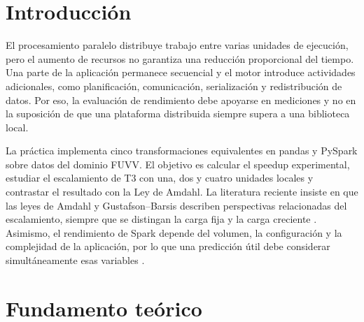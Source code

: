 \documentclass[11pt,a4paper]{article}
\begin{document}
\begin{abstract}
Se comparó un pipeline secuencial implementado con pandas y su equivalente con PySpark sobre 520,000 solicitudes sintéticas del dominio FUVV. Cinco transformaciones independientes se midieron con una ejecución de calentamiento descartada y cinco repeticiones cronometradas; la mediana se utilizó como estadístico principal. En la configuración base, pandas fue más rápido en las cinco operaciones: el speedup frente a Spark varió entre 0,1282 para T1 y 0,8064 para T5. Para T3, el tiempo de Spark descendió de \SI{11.980450}{\second} con una unidad local a \SI{9.909173}{\second} con cuatro, con un speedup interno de 1,2090 y eficiencia de 0,3023. Los resultados muestran que, para este volumen y una máquina virtual con recursos limitados, la sobrecarga de planificación, serialización y shuffle domina el beneficio del paralelismo. El trabajo conserva código, mediciones, figuras y evidencia de Spark UI para facilitar su reproducción.
\end{abstract}

\section{Introducción}
El procesamiento paralelo distribuye trabajo entre varias unidades de ejecución, pero el aumento de recursos no garantiza una reducción proporcional del tiempo. Una parte de la aplicación permanece secuencial y el motor introduce actividades adicionales, como planificación, comunicación, serialización y redistribución de datos. Por eso, la evaluación de rendimiento debe apoyarse en mediciones y no en la suposición de que una plataforma distribuida siempre supera a una biblioteca local.

La práctica implementa cinco transformaciones equivalentes en pandas y PySpark sobre datos del dominio FUVV. El objetivo es calcular el speedup experimental, estudiar el escalamiento de T3 con una, dos y cuatro unidades locales y contrastar el resultado con la Ley de Amdahl. La literatura reciente insiste en que las leyes de Amdahl y Gustafson--Barsis describen perspectivas relacionadas del escalamiento, siempre que se distingan la carga fija y la carga creciente \cite{karbowski2025}. Asimismo, el rendimiento de Spark depende del volumen, la configuración y la complejidad de la aplicación, por lo que una predicción útil debe considerar simultáneamente esas variables \cite{shen2023spark}.

\section{Fundamento teórico}
\end{document}

